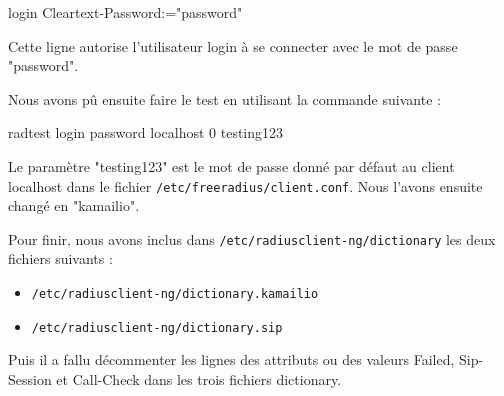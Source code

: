 login Cleartext-Password:="password"

Cette ligne autorise l'utilisateur login à se connecter avec le mot de passe "password".

Nous avons pû ensuite faire le test en utilisant la commande suivante :

\begin{shell}
radtest login password localhost 0 testing123
\end{shell}

Le paramètre "testing123" est le mot de passe donné par défaut au client localhost dans le fichier \texttt{/etc/freeradius/client.conf}. Nous l'avons ensuite changé en "kamailio".

Pour finir, nous avons inclus dans \texttt{/etc/radiusclient-ng/dictionary} les deux fichiers suivants :

\begin{itemize}
\item{\texttt{/etc/radiusclient-ng/dictionary.kamailio}}
\item{\texttt{/etc/radiusclient-ng/dictionary.sip}}
\end{itemize}

Puis il a fallu décommenter les lignes des attributs ou des valeurs Failed, Sip-Session et Call-Check dans les trois fichiers dictionary.
